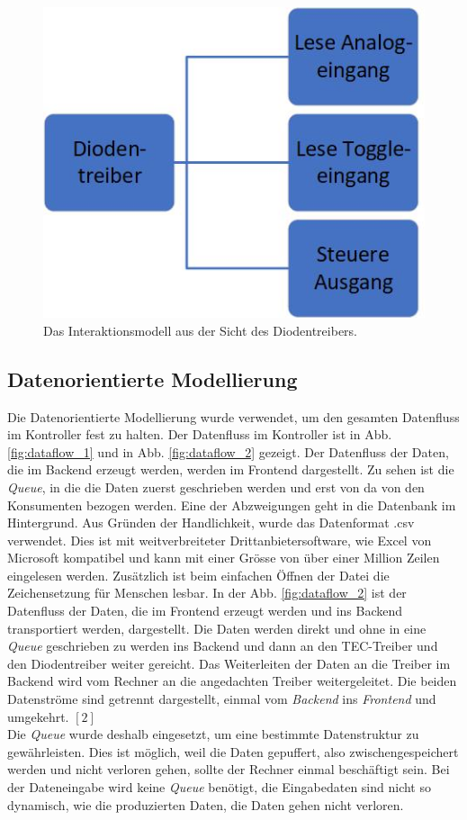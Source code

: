 \begin{figure}[H]
    \centering
    \includegraphics[scale=0.5]{98_images/interaktionsmodell_ldd.jpg}
    \caption{Das Interaktionsmodell aus der Sicht des Diodentreibers.}
    \label{fig:interaktionsmodell_ldd}
\end{figure}

\subsection{Datenorientierte Modellierung}
Die Datenorientierte Modellierung wurde verwendet, um den gesamten Datenfluss im Kontroller fest zu halten. Der Datenfluss im Kontroller ist in Abb. \ref{fig:dataflow_1} und in Abb. \ref{fig:dataflow_2} gezeigt. Der Datenfluss der Daten, die im Backend erzeugt werden, werden im Frontend dargestellt. Zu sehen ist die \textit{Queue}, in die die Daten zuerst geschrieben werden und erst von da von den Konsumenten bezogen werden. Eine der Abzweigungen geht in die Datenbank im Hintergrund. Aus Gründen der Handlichkeit, wurde das Datenformat .csv verwendet. Dies ist mit weitverbreiteter Drittanbietersoftware, wie Excel von Microsoft kompatibel und kann mit einer Grösse von über einer Million Zeilen eingelesen werden. Zusätzlich ist beim einfachen Öffnen der Datei die Zeichensetzung für Menschen lesbar. In der Abb. \ref{fig:dataflow_2} ist der Datenfluss der Daten, die im Frontend erzeugt werden und ins Backend transportiert werden, dargestellt. Die Daten werden direkt und ohne in eine \textit{Queue} geschrieben zu werden ins Backend und dann an den TEC-Treiber und den Diodentreiber weiter gereicht. Das Weiterleiten der Daten an die Treiber im Backend wird vom Rechner an die angedachten Treiber weitergeleitet. Die beiden Datenströme sind getrennt dargestellt, einmal vom \textit{Backend} ins \textit{Frontend} und umgekehrt. $[2]$\\  %
Die \textit{Queue} wurde deshalb eingesetzt, um eine bestimmte Datenstruktur zu gewährleisten. Dies ist möglich, weil die Daten gepuffert, also zwischengespeichert werden und nicht verloren gehen, sollte der Rechner einmal beschäftigt sein. Bei der Dateneingabe wird keine \textit{Queue} benötigt, die Eingabedaten sind nicht so dynamisch, wie die produzierten Daten, die Daten gehen nicht verloren.

